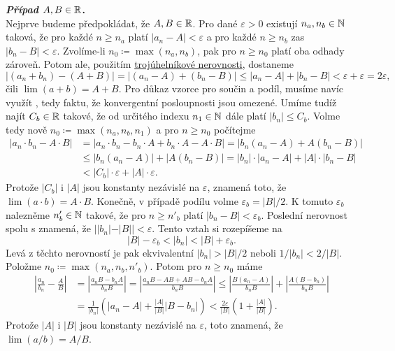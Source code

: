 \begin{thmproof}
 \textbf{\emph{Případ $A,B \in \mathbb{R}$}.}\\
 Nejprve budeme předpokládat, že $A,B \in \mathbb{R}$. Pro dané $\varepsilon>0$ existují
 $n_a,n_b \in \mathbb{N}$ taková, že pro každé $n \geq n_a$ platí $|a_n-A|<\varepsilon$
 a pro každé $n \geq n_b$ zas $|b_n-B|<\varepsilon$. Zvolíme-li $n_0 \coloneqq
 \max(n_a,n_b)$, pak pro $n \geq n_0$ platí oba odhady zároveň. Potom ale,
 použitím \hyperref[lem:trojuhelnikova-nerovnost]{trojúhelníkové nerovnosti},
 dostaneme
 \[
  |(a_n+b_n)-(A+B)| = |(a_n-A)+(b_n-B)| \leq |a_n-A| + |b_n-B| <
  \varepsilon+\varepsilon = 2\varepsilon,
 \]
 čili $\lim (a+b) = A+B$. Pro důkaz vzorce pro součin a podíl, musíme navíc
 využít , tedy faktu, že konvergentní
 posloupnosti jsou omezené. Umíme tudíž najít $C_b \in \mathbb{R}$ takové, že od
 určitého indexu $n_1 \in \mathbb{N}$ dále platí $|b_n| \leq C_b$. Volme tedy nově $n_0
 \coloneqq \max(n_a,n_b,n_1)$ a pro $n \geq n_0$ počítejme
 \begin{align*}
  |a_n \cdot b_n - A \cdot B| &= |a_n \cdot b_n - b_n \cdot A + b_n \cdot A -
  A \cdot B| = |b_n(a_n - A) + A(b_n - B)|\\
                              & \leq |b_n(a_n - A)| + |A(b_n-B)| = |b_n| \cdot
                              |a_n-A| + |A| \cdot |b_n-B| \\
                              &< |C_b| \cdot \varepsilon + |A| \cdot
                              \varepsilon.
 \end{align*}
 Protože $|C_b|$ i $|A|$ jsou konstanty nezávislé na $\varepsilon$, znamená
 toto, že $\lim (a \cdot b) = A \cdot B$. Konečně, v případě podílu volme
 $\varepsilon_b = |B| / 2$. K tomuto $\varepsilon_b$ nalezněme $n'_b \in \mathbb{N}$
 takové, že pro $n \geq n'_b$ platí $|b_n - B| < \varepsilon_b$. Poslední
 nerovnost spolu s  znamená, že $|
 |b_n| - |B| | < \varepsilon$. Tento vztah si rozepíšeme na
 \[
  |B| - \varepsilon_b < |b_n| < |B| + \varepsilon_b.
 \]
 Levá z těchto nerovností je pak ekvivalentní $|b_n| > |B| / 2$ neboli $1 /
 |b_n| < 2 / |B|$. Položme $n_0 \coloneqq \max(n_a,n_b,n'_b)$. Potom pro $n \geq
 n_0$ máme
 \begin{align*}
  \left| \frac{a_n}{b_n} - \frac{A}{B} \right| &= \left| \frac{a_nB -
  b_nA}{b_nB} \right| = \left| \frac{a_nB - AB + AB - b_nA}{b_nB} \right| \leq
  \left| \frac{B(a_n-A)}{b_nB} \right| + \left| \frac{A(B - b_n)}{b_nB} \right|
  \\
                                               &= \frac{1}{|b_n|}\left(|a_n-A| +
                                               \frac{|A|}{|B|}|B-b_n| \right) <
                                               \frac{2\varepsilon}{|B|}\left(1 +
                                               \frac{|A|}{|B|}\right).
 \end{align*}
 Protože $|A|$ i $|B|$ jsou konstanty nezávislé na $\varepsilon$, toto znamená,
 že $\lim (a / b) = A / B$.


\end{thmproof}
